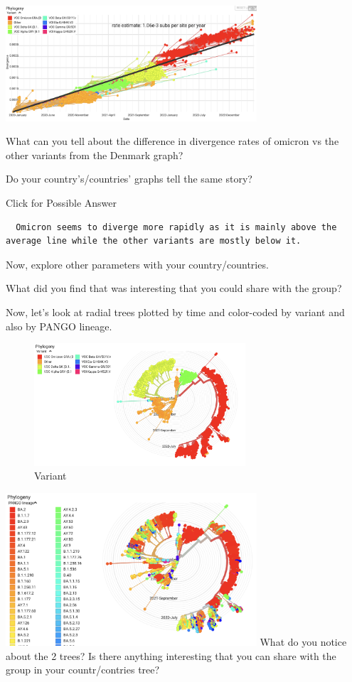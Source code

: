 \documentclass[
]{book}
\begin{document}
\includegraphics[width=0.7\textwidth,height=\textheight]{./Figures/DenmarkLinear.png}

What can you tell about the difference in divergence rates of omicron vs the other variants from the Denmark graph?

Do your country's/countries' graphs tell the same story?

Click for Possible Answer

\begin{verbatim}
  Omicron seems to diverge more rapidly as it is mainly above the average line while the other variants are mostly below it.
\end{verbatim}

\hfill\break

Now, explore other parameters with your country/countries.

What did you find that was interesting that you could share with the group?

Now, let's look at radial trees plotted by time and color-coded by variant and also by PANGO lineage.

\begin{figure}
\centering
\includegraphics[width=0.7\textwidth,height=\textheight]{./Figures/DenmarkRadialTime.png}
\caption{Variant}
\end{figure}

\includegraphics[width=0.7\textwidth,height=\textheight]{./Figures/DenmarkRadialTimePango.png}
What do you notice about the 2 trees? Is there anything interesting that you can share with the group in your countr/contries tree?
\end{document}
